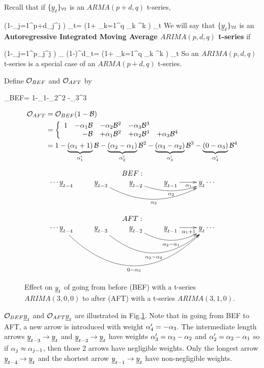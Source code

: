 Recall
that if
$\tseries{\rvy_t}$ is an $ARMA(p+d,q)$
t-series,

\beq
\left(1-\sum_{j=1}^{p+d}\alp_j\calb^j
\right)
\rvy_t=
\left(1+
\sum_{k=1}^q \nu_k \calb^k
\right)
\rvn_t
\eeq
We will
say that
$\tseries{\rvy_t}$
is an {\bf Autoregressive Integrated
 Moving Average
$ARIMA(p,d,q)$ t-series} if



\beq
\left(1-\sum_{j=1}^{p}\alp_j\calb^j
\right)
_
{(1-\calb)^d\rvy_t}=
\left(1+
\sum_{k=1}^q \nu_k \calb^k
\right)
\rvn_t
\eeq
So an $ARIMA(p,d,q)$ t-series
is a special
case of an $ARMA(p+d, q)$ t-series.

Define ${\cal O}_{BEF}$ and ${\cal O}_{AFT}$ by

\beq
\calo_{BEF}=
1-\alp_1\calb-\alp_2\calb^2
-\alp_3\calb^3
\eeq

\begin{align}
{\cal O}_{AFT}
&={\cal O}_{BEF}(1-{\cal B})
\\
&=
\left\{
\begin{array}{rrrrr}
1
&-\alpha_1{\cal B}
&-\alpha_2{\cal B}^2
&-\alpha_3{\cal B}^3
\\
&
-{\cal B}
&+\alpha_1{\cal B}^2
&+\alpha_2{\cal B}^3
&+\alpha_3{\cal B}^4
\end{array}
\right.
\\
&=
1  -\underbrace{(\alpha_1+1)}_{\alpha_1'}{\cal B}
-\underbrace{(\alpha_2-\alpha_1)}_{\alpha_2'}{\cal B}^2
-\underbrace{(\alpha_3-\alpha_2)}_{\alpha_3'}{\cal B}^3
-\underbrace{(0-\alpha_3)}_{\alpha_4'}{\cal B}^4
\end{align}

\begin{figure}[h!]
$$
\begin{array}{c}
BEF:
\\
\xymatrix{
\cdots
\rvy_{t-4}
&\rvy_{t-3}\ar@/_2pc/[rrr]_{\alp_3}
&\rvy_{t-2}\ar@/_1pc/[rr]_{\alp_2}
&\rvy_{t-1}\ar[r]_{\alp_1}
&\rvy_t
\cdots
}
\\
\\
AFT:
\\
\xymatrix{
\cdots
\rvy_{t-4}\ar@/_4.5pc/[rrrr]_{0-\alp_3}
&\rvy_{t-3}\ar@/_3pc/[rrr]_{\alp_3-\alp_2}
&\rvy_{t-2}\ar@/_1.5pc/[rr]_{\alp_2-\alp_1}
&\rvy_{t-1}\ar[r]_{\alp_1+1}
&\rvy_t
\cdots
}
\end{array}
$$
\caption{
Effect on $\rvy_t$
of going from
before (BEF)
with a t-series $ARIMA(3,0,0)$
to after (AFT)
with a t-series $ARIMA(3, 1, 0)$.
}
\label{fig-bef-aft-diff}
\end{figure}

$\calo_{BEF}\rvy_t$
and $\calo_{AFT}\rvy_t$
are illustrated in
Fig.\ref{fig-bef-aft-diff}.
Note that
in going from BEF to AFT,
a new arrow is
introduced
with weight $\alpha_4'
=-\alpha_3$.
The intermediate length
arrows $\rvy_{t-3}\rarrow \rvy_t$
and $\rvy_{t-2}\rarrow \rvy_t$
have weights $\alpha_3'=\alpha_3-\alpha_2$
and $\alpha_2'=\alpha_2-\alpha_1$
so if $\alpha_j\approx \alpha_{j-1}$,
then those 2
arrows have negligible weights.
Only the
longest arrow
$\rvy_{t-4}\rarrow\rvy_t$
and the shortest arrow $\rvy_{t-1}\rarrow \rvy_t$
have non-negligible weights.

